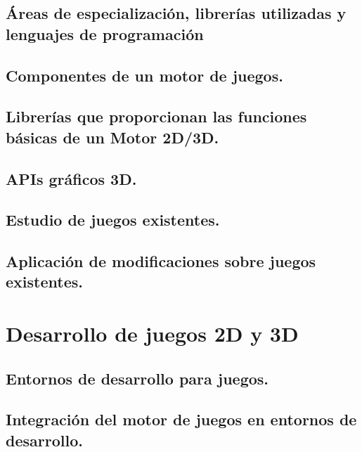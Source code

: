 \documentclass[a4paper,12pt,spanish]{sphinxmanual}
\begin{document}
\section{Áreas de especialización, librerías utilizadas y lenguajes de programación}
\label{index:areas-de-especializacion-librerias-utilizadas-y-lenguajes-de-programacion}

\section{Componentes de un motor de juegos.}
\label{index:componentes-de-un-motor-de-juegos}

\section{Librerías que proporcionan las funciones básicas de un Motor 2D/3D.}
\label{index:librerias-que-proporcionan-las-funciones-basicas-de-un-motor-2d-3d}

\section{APIs gráficos 3D.}
\label{index:apis-graficos-3d}

\section{Estudio de juegos existentes.}
\label{index:estudio-de-juegos-existentes}

\section{Aplicación de modificaciones sobre juegos existentes.}
\label{index:aplicacion-de-modificaciones-sobre-juegos-existentes}

\chapter{Desarrollo de juegos 2D y 3D}
\label{index:desarrollo-de-juegos-2d-y-3d}

\section{Entornos de desarrollo para juegos.}
\label{index:entornos-de-desarrollo-para-juegos}

\section{Integración del motor de juegos en entornos de desarrollo.}
\label{index:integracion-del-motor-de-juegos-en-entornos-de-desarrollo}
\end{document}
